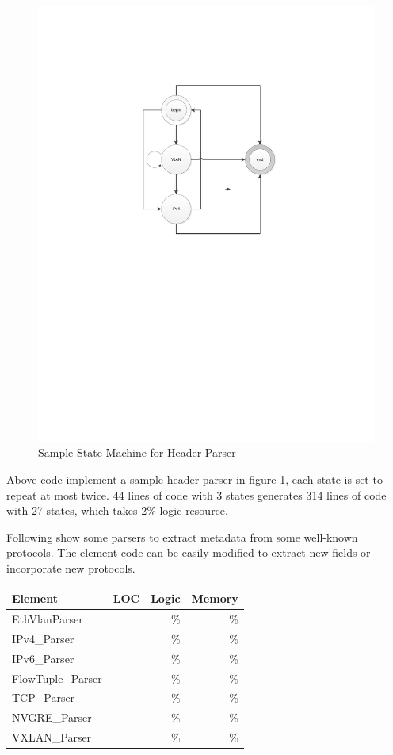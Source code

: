 \begin{figure}[!t]
	\centering
	\includegraphics[width=0.7\columnwidth]{image/StateMachine}
	\vspace{-0.15in}
	\caption{Sample State Machine for Header Parser}
	\vspace{-0.15in}
	\label{fig:StateMachine}
\end{figure}

Above code implement a sample header parser in figure \ref{fig:StateMachine}, each state is set to repeat at most twice. 44 lines of code with 3 states generates 314 lines of code with 27 states, which takes 2\% logic resource.

Following show some parsers to extract metadata from some well-known protocols. The element code can be easily modified to extract new fields or incorporate new protocols.

\begin{table}[h!]
	\centering
	\label{tab:PacketParsers}
	\begin{tabular}{l|r|r|r}
		Element & LOC & Logic & Memory \\
		\hline
		EthVlanParser & & \% & \% \\
		IPv4\_Parser & & \% & \% \\
		IPv6\_Parser & & \% & \% \\
		FlowTuple\_Parser & & \% & \% \\
		TCP\_Parser & & \% & \% \\
		NVGRE\_Parser & & \% & \% \\
		VXLAN\_Parser & & \% & \% \\
	\end{tabular}
\end{table}

